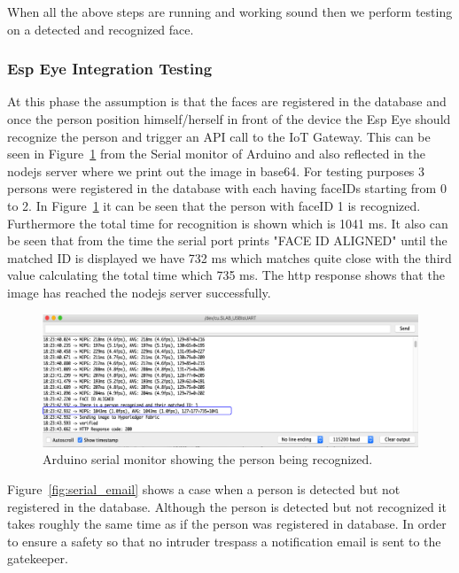 When all the above steps are running and working sound then we perform testing on a detected and recognized face. 

\subsubsection{Esp Eye Integration Testing}

At this phase the assumption is that the faces are registered in the database and once the person position himself/herself in front of the device the Esp Eye should recognize the person and trigger an API call to the IoT Gateway. This can be seen in Figure~\ref{fig:serial_monitor} from the Serial monitor of Arduino and also reflected in the nodejs server where we print out the image in base64.  For testing purposes 3 persons were registered in the database with each having faceIDs starting from 0 to 2. In Figure~\ref{fig:serial_monitor} it can be seen that the person with faceID 1 is recognized. Furthermore the total time for recognition is shown which is 1041 ms. It also can be seen that from the time the serial port prints "FACE ID ALIGNED"  until the matched ID is displayed we have 732 ms which matches quite close with the third value calculating the total time which 735 ms. The http response shows that the image has reached the nodejs server successfully. 



\begin{figure}[!htb]
    \centering
    \includegraphics[width=1\textwidth]{figures/serialport1_highlight.png}
    \caption{Arduino serial monitor showing the person being recognized.}
    \label{fig:serial_monitor}
\end{figure}

Figure~\ref{fig:serial_email} shows a case when a person is detected but not registered in the database. Although the person is detected but not recognized it takes roughly the same time as if the person was registered in database. In order to ensure a safety so that no intruder trespass a notification email is sent to the gatekeeper. 

